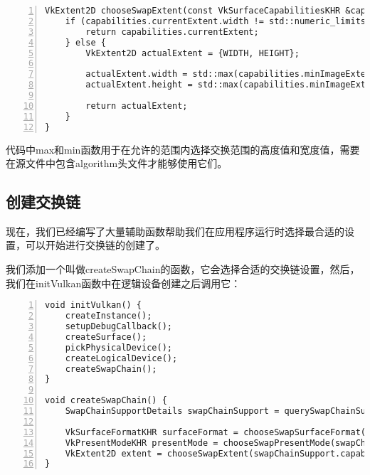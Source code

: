 \documentclass{ctexart}
\begin{document}
\begin{lstlisting}[language={[ANSI]C},keywordstyle=\color{blue!70},commentstyle=\color{red!50!green!50!blue!50},frame=shadowbox, rulesepcolor=\color{red!20!green!20!blue!20},basicstyle=\small,numbers=left, numberstyle=\tiny,breaklines=true]
VkExtent2D chooseSwapExtent(const VkSurfaceCapabilitiesKHR &capabilities) {
	if (capabilities.currentExtent.width != std::numeric_limits<uint32_t>::max()) {
		return capabilities.currentExtent;
	} else {
		VkExtent2D actualExtent = {WIDTH, HEIGHT};

		actualExtent.width = std::max(capabilities.minImageExtent.width, std::min(capabilities.maxImageExtent.width, actualExtent.width));
		actualExtent.height = std::max(capabilities.minImageExtent.height, std::min(capabilities.maxImageExtent.height, actualExtent.height));

		return actualExtent;
	}
}
\end{lstlisting}

代码中max和min函数用于在允许的范围内选择交换范围的高度值和宽度值，需要在源文件中包含algorithm头文件才能够使用它们。

\subsection{创建交换链}

现在，我们已经编写了大量辅助函数帮助我们在应用程序运行时选择最合适的设置，可以开始进行交换链的创建了。

我们添加一个叫做createSwapChain的函数，它会选择合适的交换链设置，然后，我们在initVulkan函数中在逻辑设备创建之后调用它：

\begin{lstlisting}[language={[ANSI]C},keywordstyle=\color{blue!70},commentstyle=\color{red!50!green!50!blue!50},frame=shadowbox, rulesepcolor=\color{red!20!green!20!blue!20},basicstyle=\small,numbers=left, numberstyle=\tiny,breaklines=true]
void initVulkan() {
	createInstance();
	setupDebugCallback();
	createSurface();
	pickPhysicalDevice();
	createLogicalDevice();
	createSwapChain();
}

void createSwapChain() {
	SwapChainSupportDetails swapChainSupport = querySwapChainSupport(physicalDevice);

	VkSurfaceFormatKHR surfaceFormat = chooseSwapSurfaceFormat(swapChainSupport.formats);
	VkPresentModeKHR presentMode = chooseSwapPresentMode(swapChainSupport.presentModes);
	VkExtent2D extent = chooseSwapExtent(swapChainSupport.capabilities);
}
\end{lstlisting}
\end{document}
